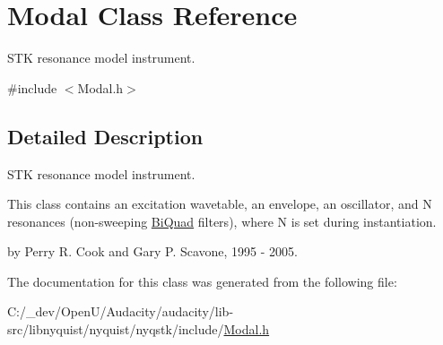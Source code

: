 \hypertarget{class_modal}{}\section{Modal Class Reference}
\label{class_modal}


S\+TK resonance model instrument.  




{\ttfamily \#include $<$Modal.\+h$>$}



\subsection{Detailed Description}
S\+TK resonance model instrument. 

This class contains an excitation wavetable, an envelope, an oscillator, and N resonances (non-\/sweeping \hyperlink{struct_bi_quad}{Bi\+Quad} filters), where N is set during instantiation.

by Perry R. Cook and Gary P. Scavone, 1995 -\/ 2005. 

The documentation for this class was generated from the following file\+:\begin{DoxyCompactItemize}
\item 
C\+:/\+\_\+dev/\+Open\+U/\+Audacity/audacity/lib-\/src/libnyquist/nyquist/nyqstk/include/\hyperlink{_modal_8h}{Modal.\+h}\end{DoxyCompactItemize}
